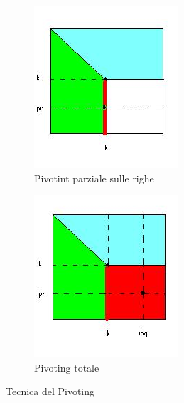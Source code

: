 \begin{figure}
\centering
\begin{subfigure}{.5\textwidth}
  \centering
  \includegraphics[width=.7\linewidth]{../Esercitazione4/images/figura_pivoting.png}
  \caption{Pivotint parziale sulle righe}
  \label{fig:pivoting1}
\end{subfigure}%
\begin{subfigure}{.5\textwidth}
  \centering
  \includegraphics[width=.7\linewidth]{../Esercitazione4/images/figura_pivoting_1.png}
  \caption{Pivoting totale}
  \label{fig:pivoting2}
\end{subfigure}
\caption{Tecnica del Pivoting}
\label{fig:pivoting}
\end{figure}

